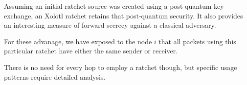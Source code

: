 \documentclass[twoside,letterpaper]{sig-alternate}
\begin{document}
\begin{figure}[th!]
\end{figure}

\smallskip

Assuming an initial ratchet source was created using a post-quantum
key exchange, an Xolotl ratchet retains that post-quantum security.
It also provides an interesting measure of forward secrecy against
a classical adversary. 

For these advanage, we have exposed to the node $i$ that all packets
using this particular ratchet have either the same sender or receiver.

There is no need for every hop to employ a ratchet though, but
 specific usage patterns require detailed analysis. 
\end{document}
